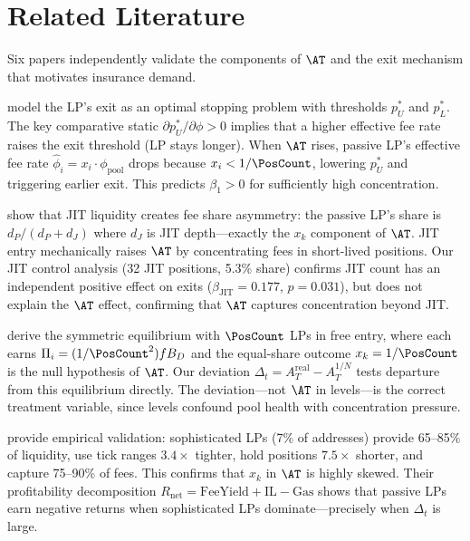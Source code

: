 
\section{Related Literature}\label{sec:related-literature}

Six papers independently validate the components of $\AT$ and the exit
mechanism that motivates insurance demand.

\cite{capponi2024optimal} model the LP's exit as an optimal stopping problem
with thresholds $p_U^*$ and $p_L^*$. The key comparative static
$\partial p_U^* / \partial \phi > 0$ implies that a higher effective fee rate
raises the exit threshold (LP stays longer). When $\AT$ rises, passive LP's
effective fee rate $\hat{\phi}_i = x_i \cdot \phi_{\text{pool}}$ drops because
$x_i < 1/\PosCount$, lowering $p_U^*$ and triggering earlier exit. This
predicts $\beta_1 > 0$ for sufficiently high concentration.

\cite{capponi2024jit} show that JIT liquidity creates fee share asymmetry: the
passive LP's share is $d_P/(d_P + d_J)$ where $d_J$ is JIT depth---exactly
the $x_k$ component of $\AT$. JIT entry mechanically raises $\AT$ by
concentrating fees in short-lived positions. Our JIT control analysis (32 JIT
positions, 5.3\% share) confirms JIT count has an independent positive effect
on exits ($\beta_{\text{JIT}} = 0.177$, $p = 0.031$), but does not explain
the $\AT$ effect, confirming that $\AT$ captures concentration beyond JIT.

\cite{macrapis2024permissionless} derive the symmetric equilibrium with
$\PosCount$ LPs in free entry, where each earns
$\Pi_i = (1/\PosCount^2) f B_D$ and the equal-share outcome
$x_k = 1/\PosCount$ is the null hypothesis of $\AT$. Our deviation
$\Delta_t = A_T^{\text{real}} - A_T^{1/N}$ tests departure from this
equilibrium directly. The deviation---not $\AT$ in levels---is the correct
treatment variable, since levels confound pool health with concentration
pressure.

\cite{aquilina2024dealers} provide empirical validation: sophisticated LPs
(7\% of addresses) provide 65--85\% of liquidity, use tick ranges
$3.4\times$ tighter, hold positions $7.5\times$ shorter, and capture
75--90\% of fees. This confirms that $x_k$ in $\AT$ is highly skewed. Their
profitability decomposition
$R_{\text{net}} = \text{FeeYield} + \text{IL} - \text{Gas}$ shows that
passive LPs earn negative returns when sophisticated LPs dominate---precisely
when $\Delta_t$ is large.

